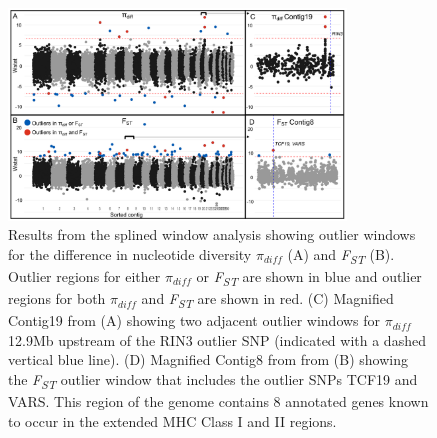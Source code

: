 \documentclass[9pt,twocolumn,twoside,lineno]{pnas-new}
\begin{document}
\begin{figure}

{\centering \includegraphics[width=0.8\textwidth]{figures/splinewindow_manhattan.png}

}

\caption{\label{fig-spline-manhattan}Results from the splined window
analysis showing outlier windows for the difference in nucleotide
diversity \(\pi_{diff}\) (A) and \emph{F\textsubscript{ST}} (B). Outlier
regions for either \(\pi_{diff}\) or \emph{F\textsubscript{ST}} are
shown in blue and outlier regions for both \(\pi_{diff}\) and
\emph{F\textsubscript{ST}} are shown in red. (C) Magnified Contig19 from
(A) showing two adjacent outlier windows for \(\pi_{diff}\) 12.9Mb
upstream of the RIN3 outlier SNP (indicated with a dashed vertical blue
line). (D) Magnified Contig8 from from (B) showing the
\emph{F\textsubscript{ST}} outlier window that includes the outlier SNPs
TCF19 and VARS. This region of the genome contains 8 annotated genes
known to occur in the extended MHC Class I and II regions.}

\end{figure}

\newpage
\end{document}
